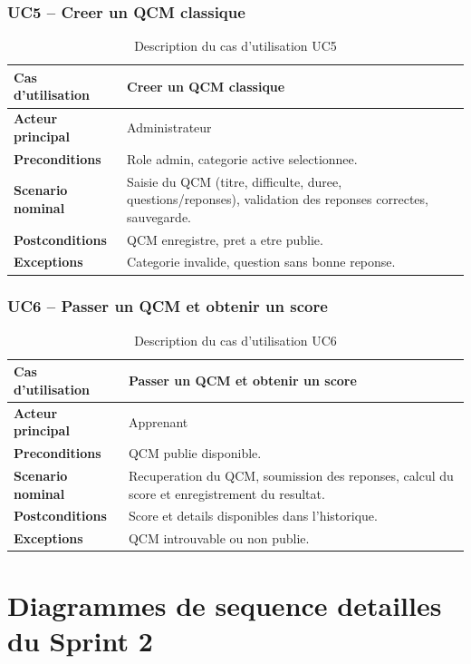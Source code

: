 \documentclass[a4paper,12pt]{report}
\begin{document}
\subsubsection{UC5 -- Creer un QCM classique}
\begin{table}[H]
  \centering
  \caption{Description du cas d'utilisation UC5}
  \begin{tabularx}{\textwidth}{>{\bfseries}p{4cm} X}
    \toprule
    Cas d'utilisation & Creer un QCM classique \\
    \midrule
    Acteur principal & Administrateur \\
    Preconditions & Role admin, categorie active selectionnee. \\
    Scenario nominal & Saisie du QCM (titre, difficulte, duree, questions/reponses),
                       validation des reponses correctes, sauvegarde. \\
    Postconditions & QCM enregistre, pret a etre publie. \\
    Exceptions & Categorie invalide, question sans bonne reponse. \\
    \bottomrule
  \end{tabularx}
\end{table}

\subsubsection{UC6 -- Passer un QCM et obtenir un score}
\begin{table}[H]
  \centering
  \caption{Description du cas d'utilisation UC6}
  \begin{tabularx}{\textwidth}{>{\bfseries}p{4cm} X}
    \toprule
    Cas d'utilisation & Passer un QCM et obtenir un score \\
    \midrule
    Acteur principal & Apprenant \\
    Preconditions & QCM publie disponible. \\
    Scenario nominal & Recuperation du QCM, soumission des reponses,
                       calcul du score et enregistrement du resultat. \\
    Postconditions & Score et details disponibles dans l'historique. \\
    Exceptions & QCM introuvable ou non publie. \\
    \bottomrule
  \end{tabularx}
\end{table}

\section{Diagrammes de sequence detailles du Sprint 2}
\end{document}
